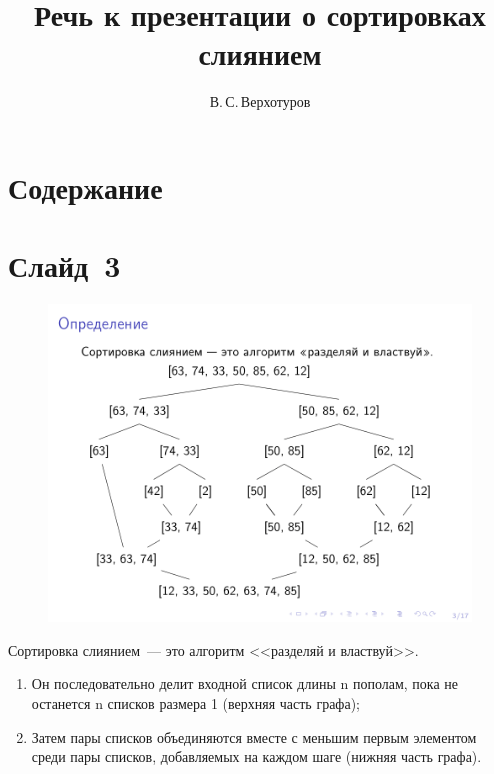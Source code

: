\documentclass[aps,pre,reprint]{revtex4-2}
\begin{document}
	
	\title{Речь к презентации о сортировках слиянием}
	
	\author{В.\,С.\,Верхотуров}

	\maketitle
	
	\section{Содержание}
	
	\tableofcontents
	
	\section{Слайд~3}
	\begin{figure}[H]
		\includegraphics[scale=.6]{presentation-03.png}
	\end{figure}

	
	Сортировка слиянием~--- это алгоритм <<разделяй и властвуй>>. 
	\begin{enumerate}
		\item Он последовательно делит входной список длины n пополам, пока не останется n списков размера 1 (верхняя часть графа);
		\item Затем пары списков объединяются вместе с меньшим первым элементом среди пары списков, добавляемых на каждом шаге (нижняя часть графа).
	\end{enumerate}
\end{document}
